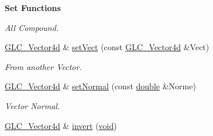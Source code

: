 \begin{Indent}{\bf Set Functions}
\begin{DoxyCompactItemize}
\begin{DoxyCompactList}\small\item\em All Compound. \end{DoxyCompactList}\item 
\hyperlink{class_g_l_c___vector4d}{G\-L\-C\-\_\-\-Vector4d} \& \hyperlink{class_g_l_c___vector4d_a954960bf3335e561ddaf6d2723b91189}{set\-Vect} (const \hyperlink{class_g_l_c___vector4d}{G\-L\-C\-\_\-\-Vector4d} \&Vect)
\begin{DoxyCompactList}\small\item\em From another Vector. \end{DoxyCompactList}\item 
\hyperlink{class_g_l_c___vector4d}{G\-L\-C\-\_\-\-Vector4d} \& \hyperlink{class_g_l_c___vector4d_aabcb4a7bc739416e4b3f68e8120968ea}{set\-Normal} (const \hyperlink{_super_l_u_support_8h_a8956b2b9f49bf918deed98379d159ca7}{double} \&Norme)
\begin{DoxyCompactList}\small\item\em Vector Normal. \end{DoxyCompactList}\item 
\hyperlink{class_g_l_c___vector4d}{G\-L\-C\-\_\-\-Vector4d} \& \hyperlink{class_g_l_c___vector4d_ade7cc445151b6dedeeda38508ef9f15b}{invert} (\hyperlink{group___u_a_v_objects_plugin_ga444cf2ff3f0ecbe028adce838d373f5c}{void})
\end{DoxyCompactItemize}
\end{Indent}
